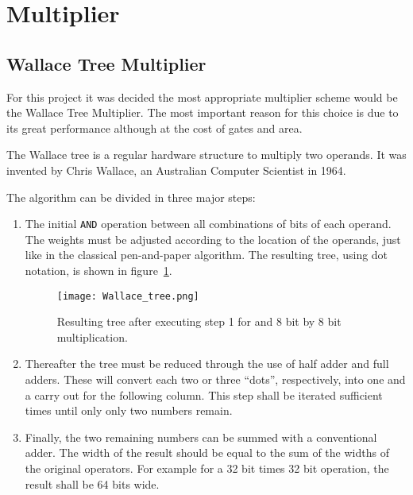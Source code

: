 \newcommand{\AND}{\texttt{AND}\xspace}
\newcommand{\RST}{\texttt{RST}\xspace}
\newcommand{\CLK}{\texttt{CLK}\xspace}
\newcommand{\HOLDN}{\texttt{HOLDN}\xspace}
\newcommand{\MULI}{\texttt{MULI}\xspace}
\newcommand{\MULO}{\texttt{MULO}\xspace}
\newcommand{\infer}{\texttt{infer}\xspace}
\newcommand{\multype}{\texttt{multype}\xspace}
\newcommand{\pipe}{\texttt{pipe}\xspace}
\newcommand{\mac}{\texttt{mac}\xspace}
\newcommand{\STDV}{\texttt{STD\_LOGIC\_VECTOR}\xspace}

\section{Multiplier}


\subsection{Wallace Tree Multiplier}
\label{sec:wallace}

For this project it was decided the most appropriate multiplier scheme would be the Wallace Tree Multiplier. The most important reason for this choice is due to its great performance although at the cost of gates and area.

The Wallace tree is a regular hardware structure to multiply two operands.
It was invented by Chris Wallace, an Australian Computer Scientist in 1964.

The algorithm can be divided in three major steps:
\begin{enumerate}
\item The initial \AND operation between all combinations of bits of each operand. The weights must be adjusted according to the location of the operands, just like in the classical pen-and-paper algorithm. The resulting tree, using dot notation, is shown in figure~\ref{fig:wallace_tree}.

\begin{figure}[H]
\centering
\texttt{[image: Wallace\_tree.png]}
\caption{Resulting tree after executing step 1 for and 8 bit by 8 bit multiplication.}
\label{fig:wallace_tree}
\end{figure}

\item Thereafter the tree must be reduced through the use of half adder and full adders. These will convert each two or three ``dots'', respectively, into one and a carry out for the following column. This step shall be iterated sufficient times until only only two numbers remain.

\item Finally, the two remaining numbers can be summed with a conventional adder. The width of the result should be equal to the sum of the widths of the original operators. For example for a 32 bit times 32 bit operation, the result shall be 64 bits wide. 
\end{enumerate}  

